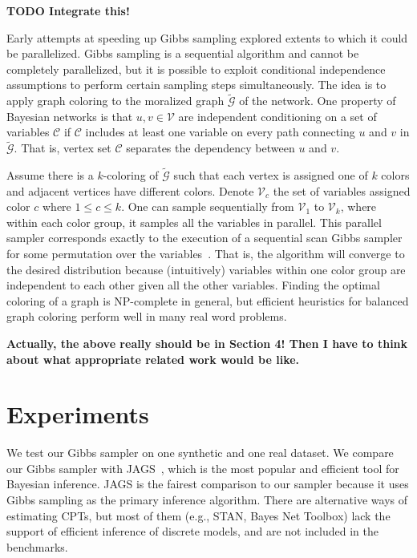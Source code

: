 \documentclass{article} %
\begin{document}
\textbf{TODO Integrate this!}

Early attempts at speeding up Gibbs sampling explored extents to which it could be parallelized.
Gibbs sampling is a sequential algorithm and cannot be completely parallelized, but it is possible
to exploit conditional independence assumptions to perform certain sampling steps simultaneously.
The idea is to apply graph coloring to the moralized graph  $\tilde{\mathcal{G}}$ of the network.
One property of Bayesian networks is that $u, v \in \mathcal{V}$ are independent conditioning on a
set of variables $\mathcal{C}$ if $\mathcal{C}$ includes at least one variable on every path
connecting $u$ and $v$ in $\tilde{\mathcal{G}}$. That is, vertex set $\mathcal{C}$ separates the
dependency between $u$ and $v$.

Assume there is a $k$-coloring of $\tilde{\mathcal{G}}$ such that each vertex is assigned one of $k$
colors and adjacent vertices have different colors. Denote $\mathcal{V}_c$ the set of variables
assigned color $c$ where $1 \leq c \leq k$. One can sample sequentially from $\mathcal{V}_1$
to $\mathcal{V}_k$, where within each color group, it samples all the variables in parallel. This
parallel sampler corresponds exactly to the execution of a sequential scan Gibbs sampler for some
permutation over the variables~\citep{Gonzalez2011}. That is, the algorithm will converge to the
desired distribution because (intuitively) variables within one color group are independent to each
other given all the other variables. Finding the optimal coloring of a graph is NP-complete in
general, but efficient heuristics for balanced graph coloring perform well in many real word
problems.

\textbf{Actually, the above really should be in Section 4! Then I have to think about what
appropriate related work would be like.}



\section{Experiments}\label{sec:experiments}

We test our Gibbs sampler on one synthetic and one real dataset.  We compare our Gibbs sampler with
JAGS~\citep{JAGS2003}, which is the most popular and efficient tool for Bayesian inference. JAGS is
the fairest comparison to our sampler because it uses Gibbs sampling as the primary inference
algorithm. There are alternative ways of estimating CPTs, but most of them (e.g., STAN, Bayes Net
Toolbox) lack the support of efficient inference of discrete models, and are not included in the
benchmarks.
\end{document}
